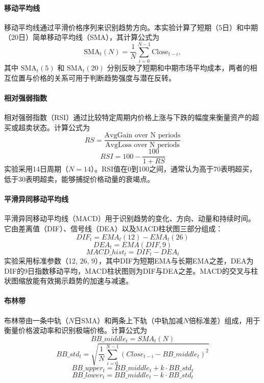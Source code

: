 \documentclass[UTF8,AutoFakeBold=1,AutoFakeSlant,zihao=-4]{SCAU}
\begin{document}
\paragraph{移动平均线}
移动平均线通过平滑价格序列来识别趋势方向。本实验计算了短期（5日）和中期（20日）简单移动平均线（SMA），其计算公式为
\begin{equation}
  \text{SMA}_t(N) = \frac{1}{N} \sum_{i=0}^{N-1} \text{Close}_{t-i},
\end{equation}
其中 $\text{SMA}_t(5)$ 和 $\text{SMA}_t(20)$ 分别反映了短期和中期市场平均成本，两者的相互位置与价格的关系可用于判断趋势强度与潜在反转。

\paragraph{相对强弱指数}
相对强弱指数（RSI）通过比较特定周期内价格上涨与下跌的幅度来衡量资产的超买或超卖状态。计算公式为
\begin{equation}
  RS = \frac{\text{AvgGain over N periods}}{\text{AvgLoss over N periods}}
\end{equation}
\begin{equation}
  RSI = 100 - \frac{100}{1 + RS}
\end{equation}
实验采用14日周期（$N=14$）。RSI值在0到100之间，通常认为高于70表明超买，低于30表明超卖，能够捕捉价格动量的衰竭点。

\paragraph{平滑异同移动平均线}
平滑异同移动平均线（MACD）用于识别趋势的变化、方向、动量和持续时间。它由差离值（DIF）、信号线（DEA）以及MACD柱状图三部分组成：
\begin{equation}
  DIF_t = EMA_t(12) - EMA_t(26)
\end{equation}
\begin{equation}
  DEA_t = EMA(DIF, 9)
\end{equation}
\begin{equation}
  MACD\_hist_t = DIF_t - DEA_t
\end{equation}
实验采用标准参数（12, 26, 9），其中DIF为短期EMA与长期EMA之差，DEA为DIF的9日指数移动平均，MACD柱状图则为DIF与DEA之差。MACD的交叉与柱状图缩放能有效揭示趋势的加速与减速。

\paragraph{布林带}
布林带由一条中轨（$N$日SMA）和两条上下轨（中轨加减$N$倍标准差）组成，用于衡量价格波动率和识别极端价格。计算公式为
\begin{equation}
  BB\_middle_t = SMA_t(N)
\end{equation}
\begin{equation}
  BB\_std_t = \sqrt{\frac{1}{N} \sum_{i=0}^{N-1} (Close_{t-i} - BB\_middle_t)^2}
\end{equation}
\begin{equation}
  BB\_upper_t = BB\_middle_t + k \cdot BB\_std_t
\end{equation}
\begin{equation}
  BB\_lower_t = BB\_middle_t - k \cdot BB\_std_t
\end{equation}
\end{document}
